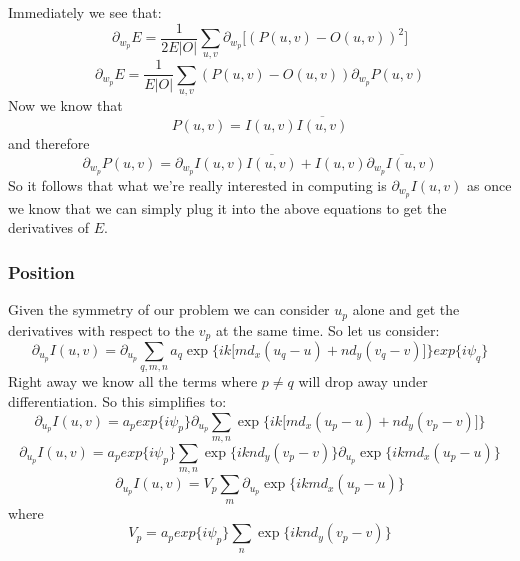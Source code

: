 \documentclass[10pt,a4paper]{article}
\begin{document}
Immediately we see that:
\begin{equation}
\partial_{w_p}E=\frac{1}{2E|O|}\sum_{u,v}\partial_{w_p}\lbrack(P(u,v) - O(u,v))^2\rbrack
\end{equation}
\begin{equation}
\partial_{w_p}E=\frac{1}{E|O|}\sum_{u,v}(P(u,v) - O(u,v))\partial_{w_p}P(u,v)
\end{equation}
Now we know that
\begin{equation}
P(u,v)=I(u,v)\overline{I(u,v)}
\end{equation}
and therefore
\begin{equation}
\partial_{w_p}P(u,v)=\partial_{w_p}I(u,v)\overline{I(u,v)}+I(u,v)\overline{\partial_{w_p}I(u,v)}
\end{equation}
So it follows that what we're really interested in computing is $\partial_{w_p}I(u,v)$ as once we know that we can simply plug it into the above equations to get the derivatives of $E$.

\subsubsection{Position}
Given the symmetry of our problem we can consider $u_p$ alone and get the derivatives with respect to the $v_p$ at the same time. So let us consider:
\begin{equation}
\partial_{u_p}I(u, v) = \partial_{u_p}\sum_{q,m,n}a_q\exp\lbrace ik \lbrack md_x(u_q-u)+nd_y(v_q-v)\rbrack\rbrace exp\lbrace i\psi_q \rbrace
\end{equation}
Right away we know all the terms where $p\neq q$ will drop away under differentiation. So this simplifies to:
\begin{equation}
\partial_{u_p}I(u, v) = a_p exp\lbrace i\psi_p \rbrace \partial_{u_p}\sum_{m,n}\exp\lbrace ik \lbrack md_x(u_p-u)+nd_y(v_p-v)\rbrack\rbrace 
\end{equation}
\begin{equation}
\partial_{u_p}I(u, v) = a_p exp\lbrace i\psi_p \rbrace \sum_{m,n} \exp\lbrace iknd_y(v_p-v)\rbrace \partial_{u_p}\exp\lbrace ikmd_x(u_p-u)\rbrace  
\end{equation}
\begin{equation}
\partial_{u_p}I(u, v) =V_p\sum_{m}\partial_{u_p}\exp\lbrace ikmd_x(u_p-u)\rbrace  
\end{equation}
where
\begin{equation}
V_p = a_p exp\lbrace i\psi_p \rbrace \sum_{n} \exp\lbrace iknd_y(v_p-v)\rbrace
\end{equation}
\end{document}
